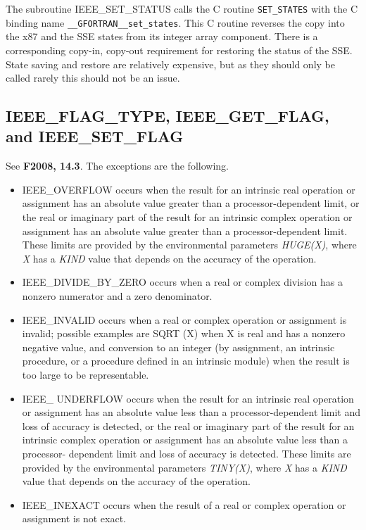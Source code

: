 \documentclass[12pt]{article}
\begin{document}
The subroutine  IEEE\_SET\_STATUS calls the C routine {\tt SET\_STATES} with
the C binding name {\tt \_\_GFORTRAN\_\_set\_states}.  This C routine reverses
the copy into
the x87 and the SSE states from  its integer array component.  There is a corresponding copy-in,
copy-out requirement for restoring the status of the SSE.
State saving and restore are relatively expensive, but as they should only be called rarely this should not be an issue.
 
\subsection{ IEEE\_FLAG\_TYPE, IEEE\_GET\_FLAG,\\  and IEEE\_SET\_FLAG}
See {\bf F2008, 14.3}.  The exceptions are the following.
\begin{itemize}
\item IEEE\_OVERFLOW occurs when the result for an intrinsic real operation or assignment has an absolute
value greater than a processor-dependent limit, or the real or imaginary part of the result for an intrinsic
complex operation or assignment has an absolute value greater than a processor-dependent limit.
These limits are provided by the environmental parameters {\it HUGE(X)}, where {\it X} has
a {\it KIND} value that depends on the accuracy of the operation.
\item IEEE\_DIVIDE\_BY\_ZERO occurs when a real or complex division has a nonzero numerator and a zero
denominator.
\item IEEE\_INVALID occurs when a real or complex operation or assignment is invalid; possible examples are
SQRT (X) when X is real and has a nonzero negative value, and conversion to an integer (by assignment,
an intrinsic procedure, or a procedure defined in an intrinsic module) when the result is too large to be
representable.
\item IEEE\_ UNDERFLOW occurs when the result for an intrinsic real operation or assignment has an absolute
value less than a processor-dependent limit and loss of accuracy is detected, or the real or imaginary part
of the result for an intrinsic complex operation or assignment has an absolute value less than a processor-
dependent limit and loss of accuracy is detected.  These limits are provided by the environmental parameters {\it TINY(X)}, where {\it X} has a {\it KIND} value that depends on the accuracy of the operation.
\item IEEE\_INEXACT occurs when the result of a real or complex operation or assignment is not exact.
\end{itemize}
\end{document}
